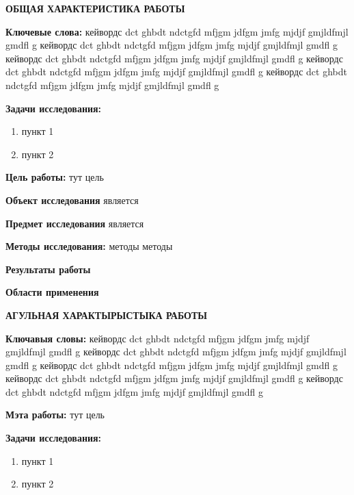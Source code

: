 \newpage
\renewcommand{\contentsname}{\centerline{\large ОГЛАВЛЕНИЕ}}
\tableofcontents

\newpage
{}


\begin{center}
	\textbf{\large ОБЩАЯ ХАРАКТЕРИСТИКА РАБОТЫ}
\end{center}


\textbf{Ключевые слова:} кейвордс dct ghbdt ndctgfd mfjgm jdfgm jmfg mjdjf gmjldfmjl gmdfl g
кейвордс dct ghbdt ndctgfd mfjgm jdfgm jmfg mjdjf gmjldfmjl gmdfl g
кейвордс dct ghbdt ndctgfd mfjgm jdfgm jmfg mjdjf gmjldfmjl gmdfl g
кейвордс dct ghbdt ndctgfd mfjgm jdfgm jmfg mjdjf gmjldfmjl gmdfl g
кейвордс dct ghbdt ndctgfd mfjgm jdfgm jmfg mjdjf gmjldfmjl gmdfl g


\textbf{Задачи исследования:}
\begin{enumerate}
	\item пункт 1
	\item пункт 2
\end{enumerate}


\textbf{Цель работы:} тут цель


\textbf{Объект исследования} является


\textbf{Предмет исследования} является


\textbf{Методы исследования:} методы методы


\textbf{Результаты работы}


\textbf{Области применения}


\newpage
{}
\begin{center}
	\textbf{\large АГУЛЬНАЯ ХАРАКТЫРЫСТЫКА РАБОТЫ}
\end{center}

\textbf{Ключавыя словы:} кейвордс dct ghbdt ndctgfd mfjgm jdfgm jmfg mjdjf gmjldfmjl gmdfl g
кейвордс dct ghbdt ndctgfd mfjgm jdfgm jmfg mjdjf gmjldfmjl gmdfl g
кейвордс dct ghbdt ndctgfd mfjgm jdfgm jmfg mjdjf gmjldfmjl gmdfl g
кейвордс dct ghbdt ndctgfd mfjgm jdfgm jmfg mjdjf gmjldfmjl gmdfl g
кейвордс dct ghbdt ndctgfd mfjgm jdfgm jmfg mjdjf gmjldfmjl gmdfl g

\textbf{Мэта работы:} тут цель

\textbf{Задачи исследования:}
\begin{enumerate}
	\item пункт 1
	\item пункт 2
\end{enumerate}

